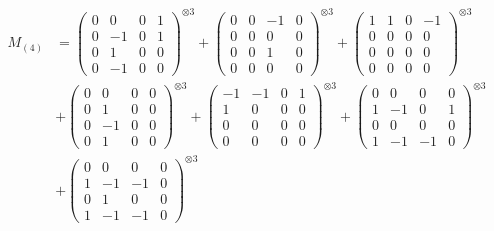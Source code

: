 \documentclass{article}
\newcommand{\Mthree}{%
    M_{(4)}
}
\begin{document}
        \newpage
        
        \footnotesize{
        \begin{align}
        \Mthree
        &= \label{Rs16-Rc11-Solution-14-c1} \begin{pmatrix} 0 & 0 & 0 & 1 \\ 0 & -1 & 0 & 1 \\ 0 & 1 & 0 & 0 \\ 0 & -1 & 0 & 0 \end{pmatrix}^{\otimes 3} 
            + \begin{pmatrix} 0 & 0 & -1 & 0 \\ 0 & 0 & 0 & 0 \\ 0 & 0 & 1 & 0 \\ 0 & 0 & 0 & 0 \end{pmatrix}^{\otimes 3} 
            + \begin{pmatrix} 1 & 1 & 0 & -1 \\ 0 & 0 & 0 & 0 \\ 0 & 0 & 0 & 0 \\ 0 & 0 & 0 & 0 \end{pmatrix}^{\otimes 3} \\
        &+ \label{Rs16-Rc11-Solution-14-c4} \begin{pmatrix} 0 & 0 & 0 & 0 \\ 0 & 1 & 0 & 0 \\ 0 & -1 & 0 & 0 \\ 0 & 1 & 0 & 0 \end{pmatrix}^{\otimes 3} 
            + \begin{pmatrix} -1 & -1 & 0 & 1 \\ 1 & 0 & 0 & 0 \\ 0 & 0 & 0 & 0 \\ 0 & 0 & 0 & 0 \end{pmatrix}^{\otimes 3} 
            + \begin{pmatrix} 0 & 0 & 0 & 0 \\ 1 & -1 & 0 & 1 \\ 0 & 0 & 0 & 0 \\ 1 & -1 & -1 & 0 \end{pmatrix}^{\otimes 3} \\
        &+ \label{Rs16-Rc11-Solution-14-c7} \begin{pmatrix} 0 & 0 & 0 & 0 \\ 1 & -1 & -1 & 0 \\ 0 & 1 & 0 & 0 \\ 1 & -1 & -1 & 0 \end{pmatrix}^{\otimes 3} 

\end{align}}
\end{document}
